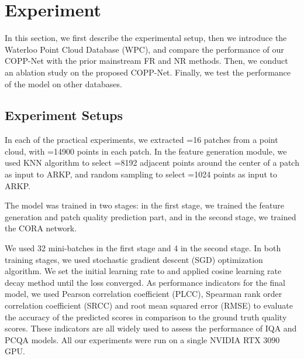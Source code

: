 \documentclass[conference]{IEEEtran}
\begin{document}
\section{Experiment}
In this section, we first describe the experimental setup, then we introduce the Waterloo Point Cloud Database (WPC), and compare the performance of our COPP-Net with the prior mainstream FR and NR methods. Then, we conduct an ablation study on the proposed COPP-Net. Finally, we test the performance of the model on other databases.



\subsection{Experiment Setups}
In each of the practical experiments, we extracted =16 patches from a point cloud, with =14900 points in each patch. In the feature generation module, we used KNN algorithm to select =8192 adjacent points around the center of a patch as input to ARKP, and random sampling to select =1024 points as input to ARKP. 

The model was trained in two stages: in the first stage, we trained the feature generation and patch quality prediction part, and in the second stage, we trained the CORA network. 





We used 32 mini-batches in the first stage and 4 in the second stage. In both training stages, we used stochastic gradient descent (SGD) optimization algorithm. We set the initial learning rate to  and applied cosine learning rate decay method until the loss converged. As performance indicators for the final model, we used Pearson correlation coefficient (PLCC), Spearman rank order correlation coefficient (SRCC) and root mean squared error (RMSE) to evaluate the accuracy of the predicted scores in comparison to the ground truth quality scores. These indicators are all widely used to assess the performance of IQA and PCQA models. All our experiments were run on a single NVIDIA RTX 3090 GPU.
\end{document}
